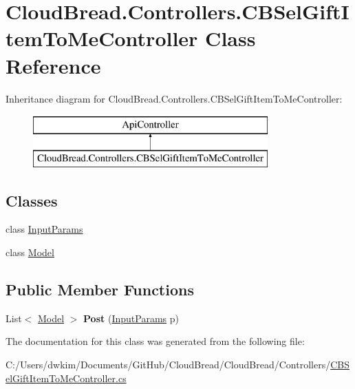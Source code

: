 \hypertarget{a00047}{}\section{Cloud\+Bread.\+Controllers.\+C\+B\+Sel\+Gift\+Item\+To\+Me\+Controller Class Reference}
\label{a00047}
Inheritance diagram for Cloud\+Bread.\+Controllers.\+C\+B\+Sel\+Gift\+Item\+To\+Me\+Controller\+:\begin{figure}[H]
\begin{center}
\leavevmode
\includegraphics[height=2.000000cm]{a00047}
\end{center}
\end{figure}
\subsection*{Classes}
\begin{DoxyCompactItemize}
\item 
class \hyperlink{a00110}{Input\+Params}
\item 
class \hyperlink{a00151}{Model}
\end{DoxyCompactItemize}
\subsection*{Public Member Functions}
\begin{DoxyCompactItemize}
\item 
List$<$ \hyperlink{a00151}{Model} $>$ {\bfseries Post} (\hyperlink{a00110}{Input\+Params} p)\hypertarget{a00047_a3cb5109a3d17222ee654657916ccf126}{}\label{a00047_a3cb5109a3d17222ee654657916ccf126}

\end{DoxyCompactItemize}


The documentation for this class was generated from the following file\+:\begin{DoxyCompactItemize}
\item 
C\+:/\+Users/dwkim/\+Documents/\+Git\+Hub/\+Cloud\+Bread/\+Cloud\+Bread/\+Controllers/\hyperlink{a00218}{C\+B\+Sel\+Gift\+Item\+To\+Me\+Controller.\+cs}\end{DoxyCompactItemize}
